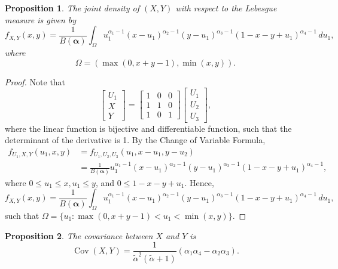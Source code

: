 \documentclass[a4paper, notitlepage, 11pt]{article}
\newcommand{\cov}{\operatorname{Cov}}
\newtheorem{proposition}{Proposition}[]
\theoremstyle{definition}
\theoremstyle{remark}
\begin{document}
\begin{proposition}
  The joint density of $(X,Y)$ with respect to the Lebesgue measure is
  given by 
  \begin{equation}
    f_{X,Y}(x,y) = \frac{1}{B(\boldsymbol{\alpha})}\int_{\Omega} u_1^{\alpha_1 - 1}(x - u_1)^{\alpha_2 -1}(y-u_1)^{\alpha_3-1}(1-x-y+u_1)^{\alpha_4-1} \, du_1,
  \end{equation}
  where 
  $$
  \Omega = (\max(0, x+y-1), \min(x,y)).
  $$
\end{proposition}

\begin{proof}
  Note that
  $$
  \begin{bmatrix}
    U_1 \\ X \\ Y
  \end{bmatrix}  = \begin{bmatrix}
    1 & 0 & 0 \\
    1 & 1 & 0 \\
    1 & 0 & 1
  \end{bmatrix}\begin{bmatrix}
    U_1 \\ U_2 \\ U_3
  \end{bmatrix}, 
  $$
  where the linear function is bijective and differentiable function, such
  that the determinant of the derivative is 1. By the Change of Variable
  Formula, 
  \begin{equation}
    \begin{split}
      f_{U_1,X,Y}(u_1,x,y) &= f_{U_1,U_2,U_3}(u_1, x - u_1, y - u_2) \\ 
      &= \frac{1}{B(\boldsymbol{\alpha})}u_1^{\alpha_1-1}(x-u_1)^{\alpha_2-1}(y-u_1 )^{\alpha_3-1}(1-x-y+u_1)^{\alpha_4-1},
    \end{split}
  \end{equation}
  where $0 \le u_1 \le x, u_1 \le y$, and $0 \le 1 - x - y + u_1$.  
  Hence,
  \begin{equation}
      \label{eq:dist-X-Y}
      f_{X,Y}(x,y) = \frac{1}{B(\boldsymbol{\alpha})}\int_{\Omega} u_1^{\alpha_1-1}(x-u_1)^{\alpha_2-1}(y-u_1)^{\alpha_3-1}(1-x-y+u_1)^{\alpha_4-1} \, du_1,
  \end{equation}
  such that $\Omega = \{u_1 : \max(0, x + y -1) < u_1 < \min(x,y)\}$.
\end{proof}

\begin{proposition}
  The covariance between $X$ and $Y$ is 
  $$\cov(X,Y) = \frac{1}{\tilde{\alpha}^2(\tilde{\alpha}+1)}(\alpha_1\alpha_4 - \alpha_2\alpha_3).$$
\end{proposition}
\end{document}
